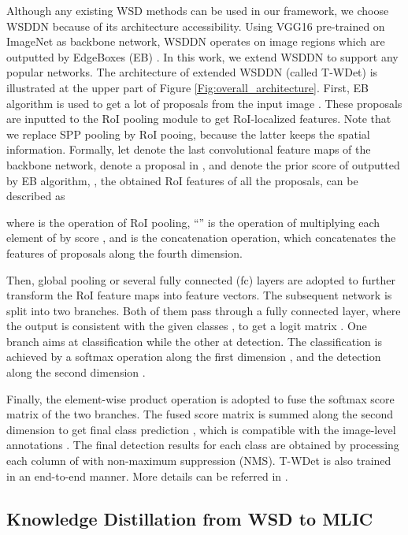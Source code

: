 \documentclass[sigconf,natbib=false]{acmart}
\begin{document}
Although any existing WSD methods can be used in our framework, we choose WSDDN \cite{WSD2_cvpr16_ha} because of its architecture accessibility.
Using VGG16  \cite{VGG_iclr15_ka} pre-trained on ImageNet \cite{ImageNet_ijcv15_ojhjsszaa} as backbone network, WSDDN operates on image regions which are outputted by EdgeBoxes (EB) \cite{WSD3_eccv14_cp}.
In this work, we extend WSDDN to support any popular networks.
The architecture of extended WSDDN (called T-WDet) is illustrated at the upper part of Figure \ref{Fig:overall_architecture}.
First, EB algorithm is used to get a lot of proposals  from the input image .
These proposals are inputted to the RoI pooling \cite{Faster-RCNN_nips15_skfj} module to get RoI-localized features.
Note that we replace SPP pooling \cite{SPP_pami15_hxsj} by RoI pooing, because the latter keeps the spatial information.
Formally, let  denote the last convolutional feature maps of the backbone network,  denote a proposal in , and  denote the prior score of  outputted by EB algorithm, , the obtained RoI features of all the proposals,  can be described as

where  is the operation of RoI pooling, ``'' is the operation of multiplying each element of  by score , and  is the concatenation operation, which concatenates the features of  proposals along the fourth dimension.

Then, global pooling or several fully connected (fc) layers are adopted to further transform the RoI feature maps  into feature vectors. The subsequent network is split into two branches. Both of them pass through a fully connected layer, where the output is consistent with the given classes , to get a logit matrix . One branch aims at classification while the other at detection. The classification is achieved by a softmax operation along the first dimension , and the detection along the second dimension .

Finally,  the element-wise product operation is adopted to fuse the softmax score matrix  of the two branches. The fused score matrix  is summed along the second dimension  to get final class prediction , which is compatible with the image-level annotations . The final detection results for each class are obtained by processing each column of  with non-maximum suppression (NMS). T-WDet is also trained in an end-to-end manner. More details can be referred in \cite{WSD2_cvpr16_ha}.

\subsection{Knowledge Distillation from WSD to MLIC}
\end{document}
